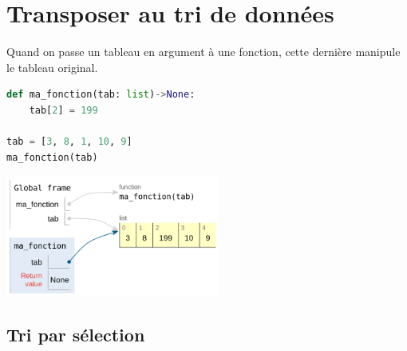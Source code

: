 \documentclass[svgnames,11pt]{beamer}
\begin{document}
\section{Transposer au tri de données}
\begin{frame}[fragile]
Quand on passe un tableau en argument à une fonction, cette dernière manipule le tableau original.
\begin{center}
\begin{lstlisting}[language=Python]
def ma_fonction(tab: list)->None:
    tab[2] = 199
    
tab = [3, 8, 1, 10, 9]
ma_fonction(tab)
\end{lstlisting}
\end{center}
\begin{center}
\centering
\includegraphics[width=7cm]{ressources/tutor-mutable.png}
\label{IMG}
\end{center}
\end{frame}

\subsection{Tri par sélection}
\end{document}
